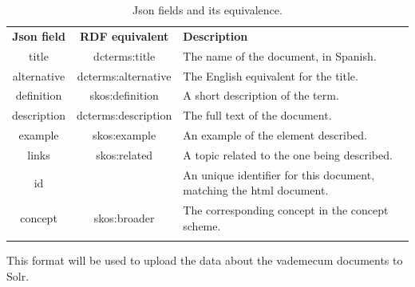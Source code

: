 \begin{center}
  \begin{table}
    \begin{tabular*}{0.7\textwidth}{@{\extracolsep{\fill}} | c | c | p{} |}
      \hhline{|-|-|-|}
      \textbf{Json field} & \textbf{RDF equivalent} & \textbf{Description} \\ \hhline{|=|=|=|}
      title & dcterms:title &  The name of the document, in Spanish. \\ \hhline{|-|-|-|}
      alternative & dcterms:alternative & The English equivalent for the title. \\ \hhline{|-|-|-|}
      definition & skos:definition & A short description of the term.  \\ \hhline{|-|-|-|}
      description & dcterms:description & The full text of the document.  \\ \hhline{|-|-|-|}
      example & skos:example & An example of the element described.  \\ \hhline{|-|-|-|}
      links & skos:related & A topic related to the one being described. \\ \hhline{|-|-|-|}
      id & & An unique identifier for this document, matching the html document. \\ \hhline{|-|-|-|}
      concept & skos:broader & The corresponding concept in the concept scheme. \\ \hhline{|-|-|-|}
      \end{tabular*}
    \caption{Json fields and its equivalence.}
    \label{tab:rdfjsonfields}
  \end{table}
\end{center}

This format will be used to upload the data about the vademecum documents to Solr.

